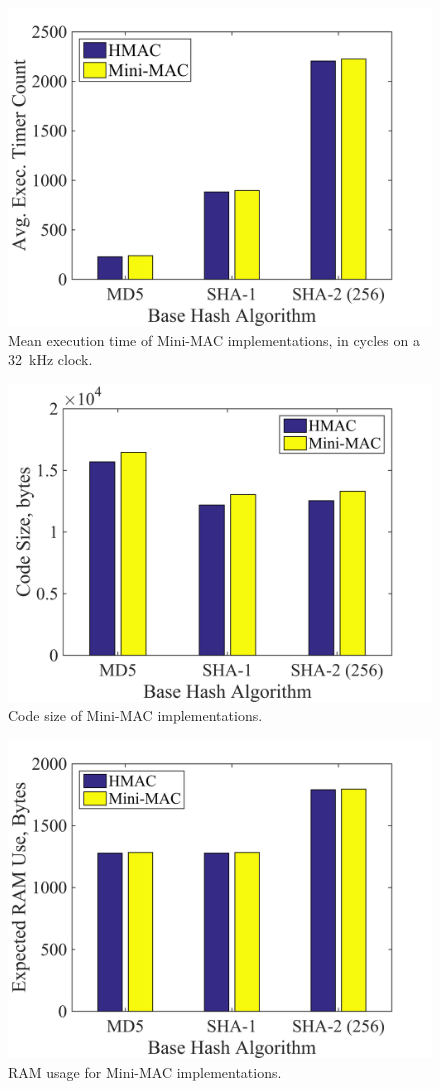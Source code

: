 	\begin{figure}
		\centering
		\includegraphics[width=\columnwidth]{figures/exec_cycles.png}
		\caption{Mean execution time of Mini-MAC implementations, in cycles on a 32~kHz clock.}
		\label{fig-execution}
	\end{figure}
	
	\begin{figure}
		\centering
		\includegraphics[width=\columnwidth]{figures/code_size.png}
		\caption{Code size of Mini-MAC implementations.}
		\label{fig-code}
	\end{figure}
	
	\begin{figure}
		\centering
		\includegraphics[width=\columnwidth]{figures/ram_usage.png}
		\caption{RAM usage for Mini-MAC implementations.}
		\label{fig-ram}
	\end{figure}
	